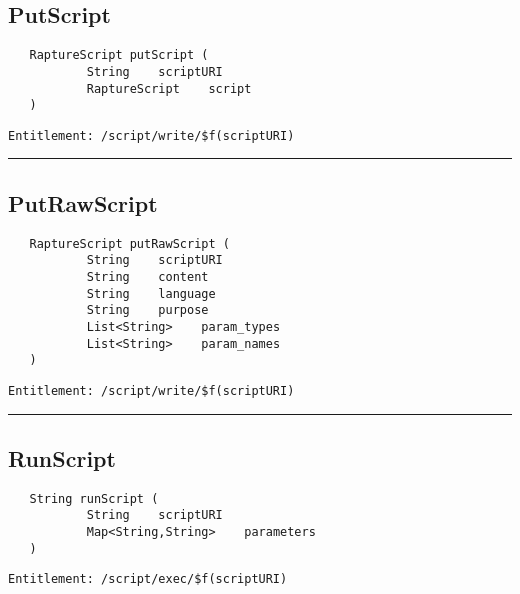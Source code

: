 \subsection{PutScript}
\label{Api:PutScript}
\begin{Verbatim}
   RaptureScript putScript (
           String    scriptURI
           RaptureScript    script
   )
\end{Verbatim}
\begin{Verbatim}[formatcom=\color{Maroon}]
  Entitlement: /script/write/$f(scriptURI)
\end{Verbatim}



\rule{12cm}{2pt}
\subsection{PutRawScript}
\label{Api:PutRawScript}
\begin{Verbatim}
   RaptureScript putRawScript (
           String    scriptURI
           String    content
           String    language
           String    purpose
           List<String>    param_types
           List<String>    param_names
   )
\end{Verbatim}
\begin{Verbatim}[formatcom=\color{Maroon}]
  Entitlement: /script/write/$f(scriptURI)
\end{Verbatim}



\rule{12cm}{2pt}
\subsection{RunScript}
\label{Api:RunScript}
\begin{Verbatim}
   String runScript (
           String    scriptURI
           Map<String,String>    parameters
   )
\end{Verbatim}
\begin{Verbatim}[formatcom=\color{Maroon}]
  Entitlement: /script/exec/$f(scriptURI)
\end{Verbatim}



